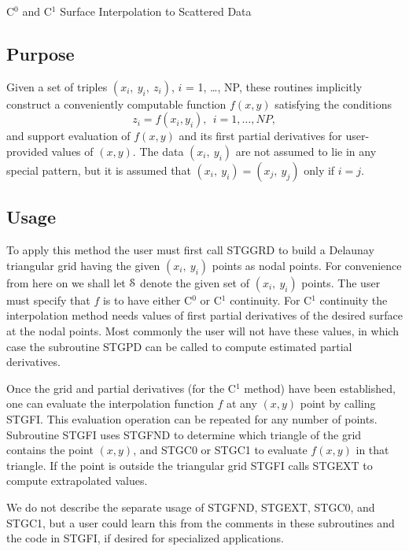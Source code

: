 \documentclass[twoside]{MATH77}
\begin{document}
 C$^0$ and C$^1$ Surface Interpolation to Scattered Data


\subsection{Purpose}
Given a set of triples $(x_i,\ y_i,\ z_i)$,
$i$ = 1, \ldots, NP, these routines implicitly construct a conveniently
computable function $f(x,y)$ satisfying the conditions
\begin{equation*}
z_i = f(x_i, y_i), \ \ i=1, \ldots , NP,
\end{equation*}
and support evaluation of $f(x,y)$ and its first partial derivatives for
user-provided values of $(x,y)$.  The data $(x_i,\ y_i)$ are not assumed
to lie in any special pattern, but it is assumed that $(x_i,\ y_i) =
(x_j,\ y_j)$ only if $i = j$.

\subsection{Usage}

To apply this method the user must first call STGGRD to build a Delaunay
triangular grid having the given $(x_i,\ y_i)$ points as nodal points.
For convenience from here on we shall let {$\EuScript S$} denote the given
set of $(x_i,\ y_i)$ points.  The user must specify that $f$ is to have
either C$^0$ or C$^1$ continuity.  For C$^1$ continuity the interpolation
method needs values of first partial derivatives of the desired surface at
the nodal points.  Most commonly the user will not have these values, in
which case the subroutine STGPD can be called to compute estimated partial
derivatives.

Once the grid and partial derivatives (for the C$^1$ method) have been
established, one can evaluate the interpolation function $f$ at any
$(x,y)$ point by calling STGFI.  This evaluation operation can be repeated
for any number of points.  Subroutine STGFI uses STGFND to determine which
triangle of the grid contains the point $(x,y)$, and STGC0 or STGC1 to
evaluate $f(x,y)$ in that triangle.  If the point is outside the
triangular grid STGFI calls STGEXT to compute extrapolated values.

We do not describe the separate usage of STGFND, STGEXT, STGC0, and STGC1,
but a user could learn this from the comments in these subroutines and the
code in STGFI, if desired for specialized applications.
\end{document}
